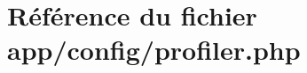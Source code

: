 \hypertarget{profiler_8php}{}\section{Référence du fichier app/config/profiler.php}
\label{profiler_8php}
